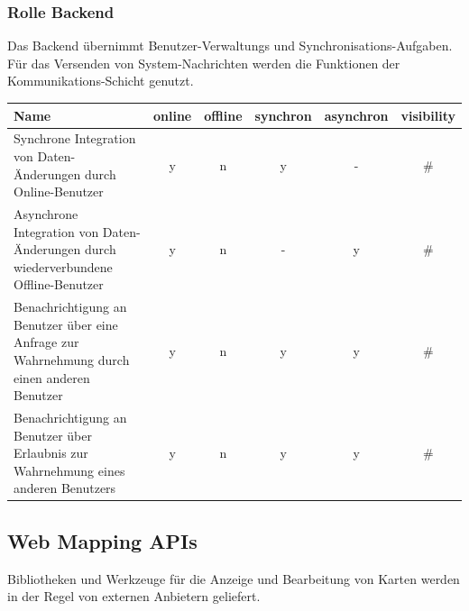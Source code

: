 \subsubsection{Rolle \textbf{Backend}}
Das Backend übernimmt Benutzer-Verwaltungs und Synchronisations-Aufgaben. Für das Versenden von System-Nachrichten werden die Funktionen der Kommunikations-Schicht genutzt.\\
	\begin{table}[H]
		\centering
		\begin{tabulary}{\columnwidth}{|L|C|C|C|C|C|}
		\hline
			\textbf{Name} & \textbf{online} & \textbf{offline} & \textbf{synchron} & \textbf{asynchron} & \textbf{visibility} \\ \hline
			Synchrone Integration von Daten-Änderungen durch Online-Benutzer & y & n & y & - & \# \\ \hline
			Asynchrone Integration von Daten-Änderungen durch wiederverbundene Offline-Benutzer & y & n & - & y & \# \\ \hline
			Benachrichtigung an Benutzer über eine Anfrage zur Wahrnehmung durch einen anderen Benutzer & y & n & y & y & \#  \\ \hline
			Benachrichtigung an Benutzer über Erlaubnis zur Wahrnehmung eines anderen Benutzers & y & n & y & y & \#  \\ \hline
		\end{tabulary}
	\end{table}

\subsection{Web Mapping APIs}\label{3_WEBMAPAPIS}
Bibliotheken und Werkzeuge für die Anzeige und Bearbeitung von Karten werden in der Regel von externen Anbietern geliefert.


